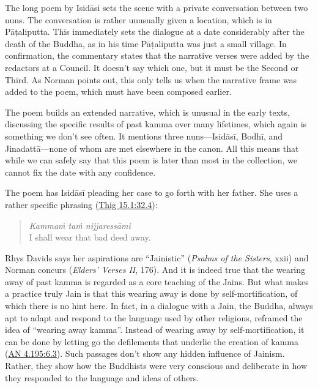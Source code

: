 \documentclass[12pt,openany]{book}%
\begin{document}
The long poem by \textsanskrit{Isidāsi} sets the scene with a private conversation between two nuns. The conversation is rather unusually given a location, which is in \textsanskrit{Pāṭaliputta}. This immediately sets the dialogue at a date considerably after the death of the Buddha, as in his time \textsanskrit{Pāṭaliputta} was just a small village. In confirmation, the commentary states that the narrative verses were added by the redactors at a Council. It doesn’t say which one, but it must be the Second or Third. As Norman points out, this only tells us when the narrative frame was added to the poem, which must have been composed earlier.

The poem builds an extended narrative, which is unusual in the early texts, discussing the specific results of past kamma over many lifetimes, which again is something we don’t see often. It mentions three nuns—\textsanskrit{Isidāsī}, \textsanskrit{Bodhī}, and \textsanskrit{Jinadattā}—none of whom are met elsewhere in the canon. All this means that while we can safely say that this poem is later than most in the collection, we cannot fix the date with any confidence.

The poem has \textsanskrit{Isidāsī} pleading her case to go forth with her father. She uses a rather specific phrasing (\href{https://suttacentral.net/thig15.1/en/sujato\#32.4}{Thig 15.1:32.4}):

\begin{quotation}%
\textit{\textsanskrit{Kammaṁ} \textsanskrit{taṁ} \textsanskrit{nijjaressāmi}} \\
I shall wear that bad deed away.

%
\end{quotation}

Rhys Davids says her aspirations are “Jainistic” (\textit{Psalms of the Sisters}, xxii) and Norman concurs (\textit{Elders’ Verses II}, 176). And it is indeed true that the wearing away of past kamma is regarded as a core teaching of the Jains. But what makes a practice truly Jain is that this wearing away is done by self-mortification, of which there is no hint here. In fact, in a dialogue with a Jain, the Buddha, always apt to adapt and respond to the language used by other religions, reframed the idea of “wearing away kamma”. Instead of wearing away by self-mortification, it can be done by letting go the defilements that underlie the creation of kamma (\href{https://suttacentral.net/an4.195/en/sujato\#6.3}{AN 4.195:6.3}). Such passages don’t show any hidden influence of Jainism. Rather, they show how the Buddhists were very conscious and deliberate in how they responded to the language and ideas of others.
\end{document}
